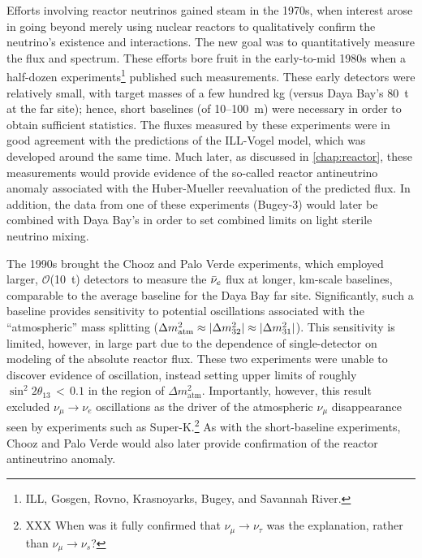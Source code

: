 \documentclass[../thesis.tex]{subfiles}
\begin{document}
Efforts involving reactor neutrinos gained steam in the 1970s, when interest
arose in going beyond merely using nuclear reactors to qualitatively confirm the
neutrino's existence and interactions. The new goal was to quantitatively
measure the flux and spectrum. These efforts bore fruit in the early-to-mid
1980s when a half-dozen experiments\footnote{ILL, Gosgen, Rovno, Krasnoyarks,
  Bugey, and Savannah River.} published such measurements. These early detectors
were relatively small, with target masses of a few hundred kg (versus Daya Bay's
80~t at the far site); hence, short baselines (of 10--100~m) were necessary in
order to obtain sufficient statistics. The fluxes measured by these experiments
were in good agreement with the predictions of the ILL-Vogel model, which was
developed around the same time. Much later, as discussed in
\autoref{chap:reactor}, these measurements would provide evidence of the
so-called reactor antineutrino anomaly associated with the Huber-Mueller
reevaluation of the predicted flux. In addition, the data from one of these
experiments (Bugey-3) would later be combined with Daya Bay's in order to set
combined limits on light sterile neutrino mixing.

The 1990s brought the Chooz and Palo Verde experiments, which employed larger,
$\mathcal{O}$(10~t) detectors to measure the $\bar\nu_e$ flux at longer, km-scale
baselines, comparable to the average baseline for the Daya Bay far
site. Significantly, such a baseline provides sensitivity to potential
oscillations associated with the ``atmospheric'' mass splitting ($\Delta
m^2_{\mathrm{atm}} \approx \lvert \Delta m^2_{32}\rvert \approx \lvert \Delta
  m^2_{31}\rvert$). This sensitivity is limited, however, in large part due to the
dependence of single-detector on modeling of the absolute reactor flux. These
two experiments were unable to discover evidence of oscillation, instead setting
upper limits of roughly $\sin^2 2\theta_{13}\,<\,0.1$ in the region of $\Delta
m^2_{\mathrm{atm}}$. Importantly, however, this result excluded $\nu_\mu
\rightarrow \nu_e$ oscillations as the driver of the atmospheric $\nu_\mu$
disappearance seen by experiments such as Super-K.\footnote{XXX When was it
  fully confirmed that $\nu_\mu \rightarrow \nu_\tau$ was the explanation,
  rather than $\nu_\mu \rightarrow \nu_s$? } As with the short-baseline
experiments, Chooz and Palo Verde would also later provide confirmation of the
reactor antineutrino anomaly.
\end{document}
